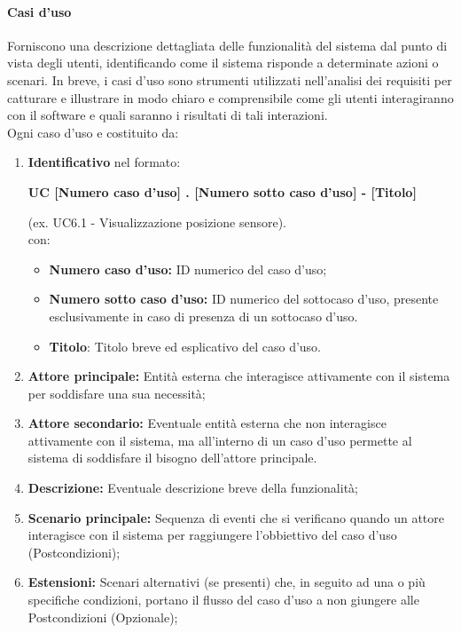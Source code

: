 \documentclass{article}
\begin{document}
\paragraph{Casi d'uso}
Forniscono una descrizione dettagliata delle funzionalità del sistema dal punto di vista degli utenti, identificando come il sistema risponde a determinate azioni o scenari. In breve, i casi d'uso sono strumenti utilizzati nell'analisi dei requisiti per catturare e illustrare in modo chiaro e comprensibile come gli utenti interagiranno con il software e quali saranno i risultati di tali interazioni. \\
Ogni caso d'uso e costituito da:
\begin{enumerate}
    \item \textbf{Identificativo} nel formato:\\
          \begin{center}
              \textbf{UC [Numero caso d'uso] . [Numero sotto caso d'uso] - [Titolo]}
          \end{center}
          (ex. UC6.1 - Visualizzazione posizione sensore).\\
          con:
          \begin{itemize}
              \item \textbf{Numero caso d'uso:} ID numerico del caso d'uso;
              \item \textbf{Numero sotto caso d'uso:} ID numerico del sottocaso d'uso, presente esclusivamente in caso di presenza di un sottocaso d'uso.
              \item \textbf{Titolo}: Titolo breve ed esplicativo del caso d'uso.
          \end{itemize}
    \item \textbf{Attore principale:} Entità esterna che interagisce attivamente con il sistema per soddisfare una sua necessità;
    \item \textbf{Attore secondario:} Eventuale entità esterna che non interagisce attivamente con il sistema, ma all'interno di un caso d'uso permette al sistema di soddisfare il bisogno dell'attore principale.
    \item \textbf{Descrizione:} Eventuale descrizione breve della funzionalità;
    \item \textbf{Scenario principale:} Sequenza di eventi che si verificano quando un attore interagisce con il sistema per raggiungere l'obbiettivo del caso d'uso (Postcondizioni);
    \item \textbf{Estensioni:} Scenari alternativi (se presenti) che, in seguito ad una o più specifiche condizioni, portano il flusso del caso d'uso a non giungere alle Postcondizioni (Opzionale);

\end{enumerate}
\end{document}
